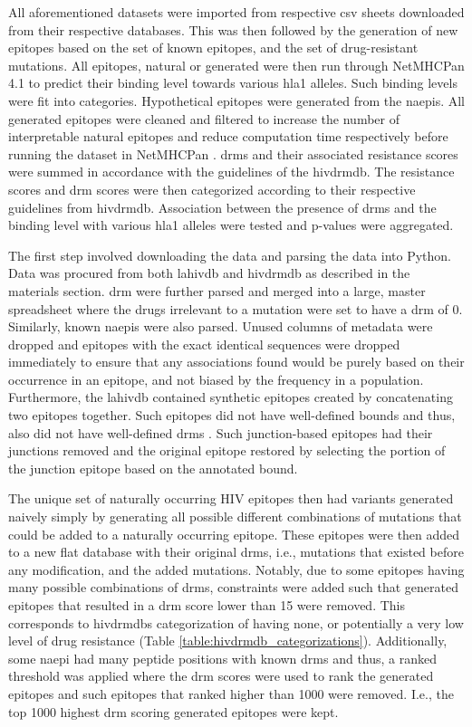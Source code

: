 All aforementioned datasets were imported from respective \ac{csv} sheets downloaded from their respective databases. This was then followed by the generation of new epitopes based on the set of known epitopes, and the set of drug-resistant mutations. All epitopes, natural or generated were then run through NetMHCPan 4.1 to predict their binding level towards various \ac{hla1} alleles. Such binding levels were fit into categories. Hypothetical epitopes were generated from the \acp{naepi}. All generated epitopes were cleaned and filtered to increase the number of interpretable natural epitopes and reduce computation time respectively before running the dataset in NetMHCPan \cite{reynissonNetMHCpan4NetMHCIIpan4Improved2020}. \Acp{drm} and their associated resistance scores were summed in accordance with the guidelines of the \ac{hivdrmdb}. The resistance scores and \ac{drm} scores were then categorized according to their respective guidelines from \ac{hivdrmdb}. Association between the presence of \acp{drm} and the binding level with various \ac{hla1} alleles were tested and p-values were aggregated.

The first step involved downloading the data and parsing the data into Python. Data was procured from both \ac{lahivdb} and \ac{hivdrmdb} as described in the materials section. \Ac{drm} were further parsed and merged into a large, master spreadsheet where the drugs irrelevant to a mutation were set to have a \ac{drm} of 0. Similarly, known \acp{naepi} were also parsed. Unused columns of metadata were dropped and epitopes with the exact identical sequences were dropped immediately to ensure that any associations found would be purely based on their occurrence in an epitope, and not biased by the frequency in a population. Furthermore, the \ac{lahivdb} contained synthetic epitopes created by concatenating two epitopes together. Such epitopes did not have well-defined bounds and thus, also did not have well-defined \acp{drm} \cite{mamroshHIVMolecularImmunology2022}. Such junction-based epitopes had their junctions removed and the original epitope restored by selecting the portion of the junction epitope based on the annotated bound.

The unique set of naturally occurring HIV epitopes then had variants generated naively simply by generating all possible different combinations of mutations that could be added to a naturally occurring epitope. These epitopes were then added to a new flat database with their original \acp{drm}, i.e., mutations that existed before any modification, and the added mutations. Notably, due to some epitopes having many possible combinations of \acp{drm}, constraints were added such that generated epitopes that resulted in a \ac{drm} score lower than 15 were removed. This corresponds to \acp{hivdrmdb} categorization of having none, or potentially a very low level of drug resistance (Table \ref{table:hivdrmdb_categorizations}). Additionally, some \ac{naepi} had many peptide positions with known \acp{drm} and thus, a ranked threshold was applied where the \ac{drm} scores were used to rank the generated epitopes and such epitopes that ranked higher than 1000 were removed. I.e., the top 1000 highest \ac{drm} scoring generated epitopes were kept.

